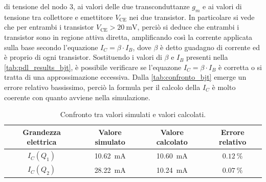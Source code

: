 di tensione del nodo 3, ai valori delle due transconduttanze $g_m$ e ai valori di tensione tra collettore e emettitore $V_\text{CE}$ nei due transistor.
In particolare si vede che per entrambi i transistor $V_\text{CE}>\SI{20}{\milli\volt}$, perciò si deduce che entrambi i transistor sono in 
regione attiva diretta, amplificando così la corrente applicata sulla base secondo l'equazione $I_C=\beta \cdot I_B$, dove $\beta$ è detto guadagno
di corrente ed è proprio di ogni transistor. Sostituendo i valori di $\beta$ e $I_B$ presenti nella \autoref*{tab:pdl_results_bjt}, è possibile 
verificare se l'equazone $I_C=\beta \cdot I_B$ è corretta o si tratta di una approssimazione eccessiva. Dalla \autoref*{tab:confronto_bjt} 
emerge un errore relativo bassissimo, perciò la formula per il calcolo della $I_C$ è molto coerente con quanto avviene nella simulazione.
\begin{table}[ht!]
    \centering
    {\renewcommand{\arraystretch}{1.3}
        \begin{tabular}{cccc}
            \toprule
            Grandezza elettrica   & Valore simulato               & Valore calcolato              & Errore relativo  \\
            \midrule                                
            $I_C(Q_1)$            & \SI{10,62}{\milli\ampere}   & \SI{10,60}{\milli\ampere}   & $\SI{0,12}{\%}$ \\
            $I_C(Q_2)$            & \SI{28,22}{\milli\ampere}   & \SI{10,24}{\milli\ampere}   & $\SI{0,07}{\%}$ \\
            \bottomrule
        \end{tabular}
    }
    \caption{Confronto tra valori simulati e valori calcolati.}
    \label{tab:confronto_bjt}
\end{table}
